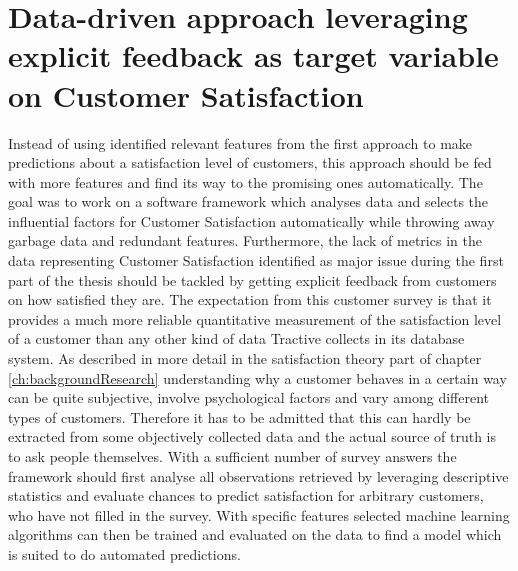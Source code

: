 \chapter{Data-driven approach leveraging explicit feedback as target variable on Customer Satisfaction}
\label{ch:dataDriven}
Instead of using identified relevant features from the first approach to make predictions about a satisfaction level of customers, this approach should be fed with more features and find its way to the promising ones automatically. The goal was to work on a software framework which analyses data and selects the influential factors for Customer Satisfaction automatically while throwing away garbage data and redundant features. Furthermore, the lack of metrics in the data representing Customer Satisfaction identified as major issue during the first part of the thesis should be tackled by getting explicit feedback from customers on how satisfied they are. The expectation from this customer survey is that it provides a much more reliable quantitative measurement of the satisfaction level of a customer than any other kind of data Tractive collects in its database system. As described in more detail in the satisfaction theory part of chapter \ref{ch:backgroundResearch} understanding why a customer behaves in a certain way can be quite subjective, involve psychological factors and vary among different types of customers. Therefore it has to be admitted that this can hardly be extracted from some objectively collected data and the actual source of truth is to ask people themselves. With a sufficient number of survey answers the framework should first analyse all observations retrieved by leveraging descriptive statistics and evaluate chances to predict satisfaction for arbitrary customers, who have not filled in the survey. With specific features selected machine learning algorithms can then be trained and evaluated on the data to find a model which is suited to do automated predictions. 

